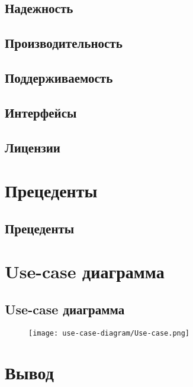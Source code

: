 \documentclass{article}
\begin{document}
  \subsection{Надежность}
  

  \subsection{Производительность}
  

  \subsection{Поддерживаемость}
  

  \subsection{Интерфейсы}
  

  \subsection{Лицензии}
  

\section{Прецеденты}

  \subsection{Прецеденты}
  

\newpage
\section{Use-case диаграмма}

  \subsection{Use-case диаграмма}
  \begin{figure}[h]
    \texttt{[image: use-case-diagram/Use-case.png]}
    \centering
  \end{figure}

\section{Вывод}

  
\end{document}
